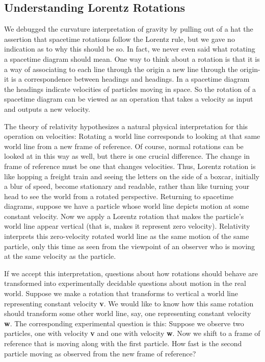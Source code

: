 \documentclass{book}
\begin{document}
\subsection{Understanding Lorentz Rotations}

We debugged the curvature interpretation of gravity by pulling out of a
hat the assertion that spacetime rotations follow the Lorentz rule, but
we gave no indication as to why this should be so. In fact, we never even
said what rotating a spacetime diagram should mean. One way to think
about a rotation is that it is a way of associating to each line through
the origin a new line through the origin-it is a correspondence between
headings and headings. In a spacetime diagram the headings indicate
velocities of particles moving in space. So the rotation of a spacetime
diagram can be viewed as an operation that takes a velocity as input
and outputs a new velocity.

The theory of relativity hypothesizes a natural physical interpretation
for this operation on velocities: Rotating a world line corresponds to
looking at that same world line from a new frame of reference. Of
course, normal rotations can be looked at in this way as well, but there
is one crucial difference. The change in frame of reference must be one
that changes velocities. Thus, Lorentz rotation is like hopping a freight
train and seeing the letters on the side of a boxcar, initially a blur of
speed, become stationary and readable, rather than like turning your
head to see the world from a rotated perspective.
Returning to spacetime diagrams, suppose we have a particle whose
world line depicts motion at some constant velocity. Now we apply
a Lorentz rotation that makes the particle's world line appear vertical
(that is, makes it represent zero velocity). Relativity interprets this zero-velocity rotated world line as the same motion of the same particle, only
this time as seen from the viewpoint of an observer who is moving at
the same velocity as the particle.

If we accept this interpretation, questions about how rotations should
behave are transformed into experimentally decidable questions about
motion in the real world. Suppose we make a rotation that transforms
to vertical a world line representing constant velocity \textbf{v}. We would like
to know how this same rotation should transform some other world
line, say, one representing constant velocity \textbf{w}. The corresponding experimental question is this: Suppose we observe two particles, one with
velocity \textbf{v} and one with velocity \textbf{w}. Now we shift to a frame of reference that is moving along with the first particle. How fast is the second
particle moving as observed from the new frame of reference?
\end{document}
